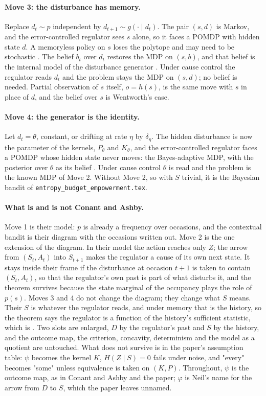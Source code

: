 \documentclass[10pt]{article}
\theoremstyle{plain}
\begin{document}
\paragraph{Move 3: the disturbance has memory.}
Replace $d_t \sim p$ independent by $d_{t+1} \sim g(\cdot \mid d_t)$.
The pair $(s,d)$ is Markov, and the error-controlled regulator sees $s$ alone, so it faces a POMDP with hidden state $d$.
A memoryless policy on $s$ loses the polytope and may need to be stochastic \citep{Singh-learning94}.
The belief $b_t$ over $d_t$ restores the MDP on $(s,b)$, and that belief is the internal model of the disturbance generator \citep{Francis-internal76}.
Under cause control the regulator reads $d_t$ and the problem stays the MDP on $(s,d)$; no belief is needed.
Partial observation of $s$ itself, $o = h(s)$, is the same move with $s$ in place of $d$, and the belief over $s$ is Wentworth's case.

\paragraph{Move 4: the generator is the identity.}
Let $d_t = \theta$, constant, or drifting at rate $\eta$ by $\delta_\eta$.
The hidden disturbance is now the parameter of the kernels, $P_\theta$ and $K_\theta$, and the error-controlled regulator faces a POMDP whose hidden state never moves: the Bayes-adaptive MDP, with the posterior over $\theta$ as its belief \citep{Duff-optimal02}.
Under cause control $\theta$ is read and the problem is the known MDP of Move 2.
Without Move 2, so with $S$ trivial, it is the Bayesian bandit of \texttt{entropy\_budget\_empowerment.tex}.

\paragraph{What is and is not Conant and Ashby.}
Move 1 is their model: $p$ is already a frequency over occasions, and the contextual bandit is their diagram with the occasions written out.
Move 2 is the one extension of the diagram.
In their model the action reaches only $Z$; the arrow from $(S_t,A_t)$ into $S_{t+1}$ makes the regulator a cause of its own next state.
It stays inside their frame if the disturbance at occasion $t+1$ is taken to contain $(S_t,A_t)$, so that the regulator's own past is part of what disturbs it, and the theorem survives because the state marginal of the occupancy plays the role of $p(s)$.
Moves 3 and 4 do not change the diagram; they change what $S$ means.
Their $S$ is whatever the regulator reads, and under memory that is the history, so the theorem says the regulator is a function of the history's sufficient statistic, which is \citet{Wentworth-fixing21}.
Two slots are enlarged, $D$ by the regulator's past and $S$ by the history, and the outcome map, the criterion, concavity, determinism and the model as a quotient are untouched.
What does not survive is in the paper's assumption table: $\psi$ becomes the kernel $K$, $H(Z \mid S) = 0$ fails under noise, and "every" becomes "some" unless equivalence is taken on $(K,P)$.
Throughout, $\psi$ is the outcome map, as in Conant and Ashby and the paper; $\varphi$ is Neil's name for the arrow from $D$ to $S$, which the paper leaves unnamed.
\end{document}
